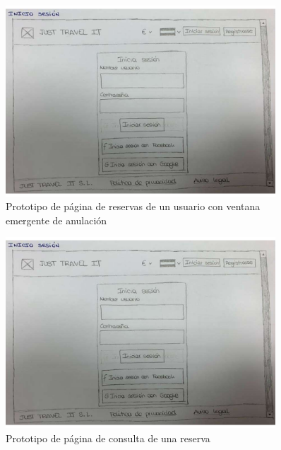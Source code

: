 \begin{figure}[H]
    \centering
    \includegraphics[page=11, width=0.9\textwidth]{./Imagenes/Prototipo/Prototipos definitivos - Iteracion I.pdf}
    \caption{Prototipo de página de reservas de un usuario con ventana emergente de anulación}
    \label{fig:prot_reservas_usuario_popup}
\end{figure}

\begin{figure}[H]
    \centering
    \includegraphics[page=13, width=0.9\textwidth]{./Imagenes/Prototipo/Prototipos definitivos - Iteracion I.pdf}
    \caption{Prototipo de página de consulta de una reserva}
    \label{fig:prot_reservas_mod}
\end{figure}


